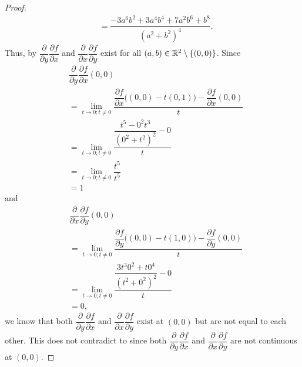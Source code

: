 \begin{proof}
\begin{align*}
     & = \dfrac{-3 a^6 b^2 + 3 a^4 b^4 + 7 a^2 b^6 + b^8}{(a^2 + b^2)^4}.
  \end{align*}
  Thus, by  \(\dfrac{\partial}{\partial y} \dfrac{\partial f}{\partial x}\) and \(\dfrac{\partial}{\partial x} \dfrac{\partial f}{\partial y}\) exist for all \((a, b) \in \mathbb{R}^2 \setminus \left\lbrace(0, 0)\right\rbrace\).
  Since
  \begin{align*}
     & \dfrac{\partial}{\partial y} \dfrac{\partial f}{\partial x}(0, 0)                                                                      \\
     & = \lim_{t \to 0 ; t \neq 0} \dfrac{\dfrac{\partial f}{\partial x}\big((0, 0) - t(0, 1)\big) - \dfrac{\partial f}{\partial x}(0, 0)}{t} \\
     & = \lim_{t \to 0 ; t \neq 0} \dfrac{\dfrac{t^5 - 0^2 t^3}{(0^2 + t^2)^2} - 0}{t}                                                        \\
     & = \lim_{t \to 0 ; t \neq 0} \dfrac{t^5}{t^5}                                                                                           \\
     & = 1
  \end{align*}
  and
  \begin{align*}
     & \dfrac{\partial}{\partial x} \dfrac{\partial f}{\partial y}(0, 0)                                                                      \\
     & = \lim_{t \to 0 ; t \neq 0} \dfrac{\dfrac{\partial f}{\partial y}\big((0, 0) - t(1, 0)\big) - \dfrac{\partial f}{\partial y}(0, 0)}{t} \\
     & = \lim_{t \to 0 ; t \neq 0} \dfrac{\dfrac{3 t^3 0^2 + t 0^4}{(t^2 + 0^2)^2} - 0}{t}                                                    \\
     & = 0,
  \end{align*}
  we know that both \(\dfrac{\partial}{\partial y} \dfrac{\partial f}{\partial x}\) and \(\dfrac{\partial}{\partial x} \dfrac{\partial f}{\partial y}\) exist at \((0, 0)\) but are not equal to each other.
  This does not contradict to  since both \(\dfrac{\partial}{\partial y} \dfrac{\partial f}{\partial x}\) and \(\dfrac{\partial}{\partial x} \dfrac{\partial f}{\partial y}\) are not continuous at \((0, 0)\).
\end{proof}
